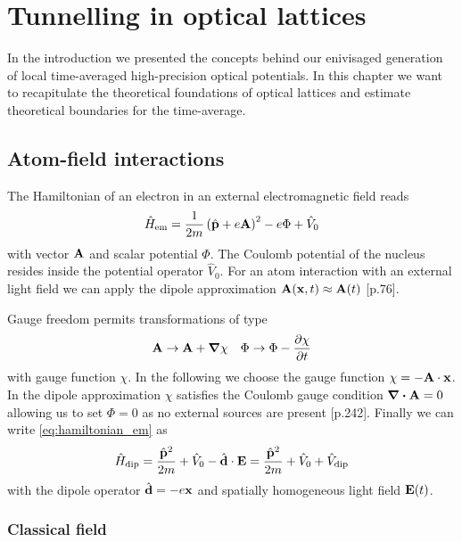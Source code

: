 \chapter{Tunnelling in optical lattices}

In the introduction we presented the concepts behind our enivisaged
generation of local time-averaged high-precision optical potentials. In this
chapter we want to recapitulate the theoretical foundations of optical
lattices and estimate theoretical boundaries for the time-average.

\section{Atom-field interactions}

The Hamiltonian of an electron in an external electromagnetic field reads
\begin{equation}
  \hat{H}_\text{em}
  =\frac{1}{2m}\left(\hat{\vb{p}}+e\vb{A}\right)^2-e\Phi+\hat{V}_0
  \label{eq:hamiltonian_em}
\end{equation}
with vector $\vb{A}$ and scalar potential $\Phi$. The Coulomb potential of
the nucleus resides inside the potential operator $\hat{V}_0$. For an atom
interaction with an external light field we can apply the dipole approximation
$\vb{A}(\vb{x},t)\approx\vb{A}(t)$ \cite{Gerry2004}[p.76].

Gauge freedom permits transformations of type
\begin{align}
  \vb{A}\to\vb{A}+\grad{\chi}
  &&
  \Phi\to\Phi-\pdv{\chi}{t}
\end{align}
with gauge function $\chi$. In the following we choose the gauge function
$\chi=-\vb{A}\cdot\vb{x}$. In the dipole approximation $\chi$ satisfies the
Coulomb gauge condition $\divergence{\vb{A}}=0$ allowing us to set $\Phi=0$
as no external sources are present \cite{Jackson2005}[p.242]. Finally we can
write \cref{eq:hamiltonian_em} as
\begin{equation}
  \hat{H}_\text{dip}
  =\frac{\hat{\vb{p}}^2}{2m}+\hat{V}_0-\hat{\vb{d}}\cdot\vb{E}
  =\frac{\hat{\vb{p}}^2}{2m}+\hat{V}_0+\hat{V}_\text{dip}
  \label{eq:hamiltonian_dip}
\end{equation}
with the dipole operator $\hat{\vb{d}}=-e\vb{x}$ and spatially homogeneous
light field $\vb{E}(t)$.

\subsection{Classical field}


